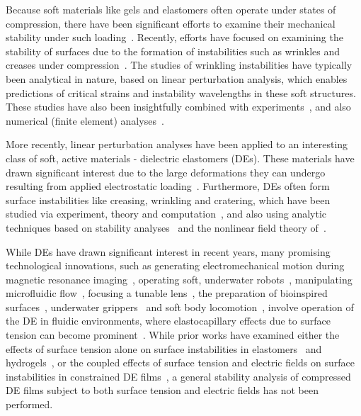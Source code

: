 \documentclass[final,3p,times]{elsarticle}
\begin{document}
Because soft materials like gels and elastomers often operate under states of compression, there have been significant efforts to examine their mechanical stability under such loading~\citep{Biot1963,gent1999surface,biot1965mechanics,tanaka1987mechanical,gent2005elastic,hong2009formation}. Recently, efforts have focused on examining the stability of surfaces due to the formation of instabilities such as wrinkles and creases under compression~\citep{cao2012wrinkling,li2012mechanics,jin2014creases,cai2012creasing,hong2013crease,weiss2013creases}. The studies of wrinkling instabilities have typically been analytical in nature, based on linear perturbation analysis, which enables predictions of critical strains and instability wavelengths in these soft structures. These studies have also been insightfully combined with experiments~\citep{cai2010osmotic,cai2012creasing,Jin2015a}, and also numerical (finite element) analyses~\citep{cao2012wrinkling,jin2015smoothening,Jin2015a,wangJAM2014,wangMRS2016}.  

More recently, linear perturbation analyses have been applied to an interesting class of soft, active materials - dielectric elastomers (DEs). These materials have drawn significant interest due to the large deformations they can undergo resulting from applied electrostatic loading~\citep{carpiSCIENCE2010,brochuMRC2010,biddissMEP2008,mirMT2007}. Furthermore, DEs often form surface instabilities like creasing, wrinkling and cratering, which have been studied via experiment, theory and computation~\citep{suoAMSS2010,planteIJSS2006,zhouIJSS2008,wangAM2012,shivapoojaAM2013,wangPRL2011a,parkIJSS2012,parkCMAME2013}, and also using analytic techniques based on stability analyses~\citep{zhaoAPL2007,zhao2009electromechanical} and the nonlinear field theory of~\citet{suoJMPS2008}.

While DEs have drawn significant interest in recent years, many promising technological innovations, such as generating electromechanical motion during magnetic resonance imaging~\citep{Carpi2008mri}, operating soft, underwater robots~\citep{rusNATURE2015,kimTB2013}, manipulating microfluidic flow~\citep{Holmes2013}, focusing a tunable lens~\citep{Carpi2011}, the preparation of bioinspired surfaces~\citep{shivapoojaAM2013}, underwater grippers~\citep{Laschi2012} and soft body locomotion~\citep{Marchese2014}, involve operation of the DE in fluidic environments, where elastocapillary effects due to surface tension can become prominent~\citep{romanJPCM2010,liuAMS2012}. While prior works have examined either the effects of surface tension alone on surface instabilities in elastomers~\citep{chenPRL2012} and hydrogels~\citep{kangSM2010}, or the coupled effects of surface tension and electric fields on surface instabilities in constrained DE films~\citep{seifiIJSS2016,wangJMPS2016}, a general stability analysis of compressed DE films subject to both surface tension and electric fields has not been performed.  
\end{document}
